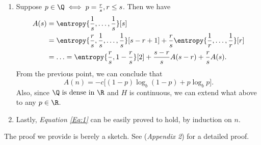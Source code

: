 \documentclass{subfiles}
\begin{document}
\begin{proof*}
\begin{enumerate}
            \item Suppose \(p \in \Q \iff p = \tfrac{r}{s}, r \le s\).
                Then we have 
                \[\begin{aligned}
                    A(s) & = \entropy{\frac{1}{s}, \ldots, \frac{1}{s}}[s] \\ 
                        & = \entropy{\frac{r}{s}, \frac{1}{s}, \ldots, \frac{1}{s}}[s - r + 1]
                          + \frac{r}{s} \entropy{\frac{1}{r}, \ldots, \frac{1}{r}}[r] \\ 
                        & = \ldots = \entropy{\frac{r}{s}, 1 - \frac{r}{s}}[2]
                          + \frac{s - r}{s} A(s - r) + \frac{r}{s} A(s).
                \end{aligned}\]
                From the previous point, we can conclude that 
                \[
                    A(n) = -c \lbrack
                        (1 - p) \log_{b} (1 - p) + p \log_{b} p
                    \rbrack.
                \]
                Also, since \(\Q \text{ is dense in } \R\) and \(H\) is continuous,
                we can extend what above to any \(p \in \R\).

            \item Lastly, \emph{Equation \eqref{Eq:1}} can be easily proved to hold,
                by induction on \(n\).

        \end{enumerate}
    \end{proof*}
    The proof we provide is berely a sketch.
    See \cite{shannon1948} (\emph{Appendix 2}) for a detailed proof.
\end{document}
